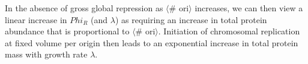 
%
%
%
%
%

In the absence of gross global repression as $\langle$\# ori$\rangle$ increases,
we can then view a linear increase in $Phi_R$ (and $\lambda$) as requiring an increase
in total protein abundance that is proportional to $\langle$\# ori$\rangle$.
Initiation of chromosomal replication at fixed volume per origin then leads to an
exponential increase in total protein mass with growth rate $\lambda$.

